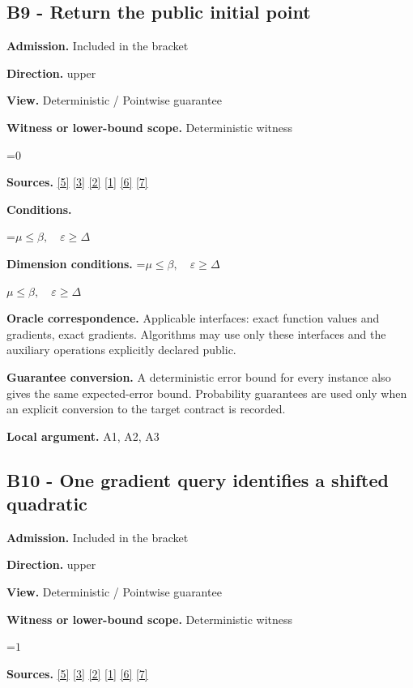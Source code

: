 \documentclass[10pt,a4paper]{article}
\newcommand{\AtlasMath}[1]{\par\begingroup\centering\setbox0=\hbox{$\displaystyle #1$}\ifdim\wd0>1.4\linewidth\typeout{ATLAS WIDE FORMULA: \the\wd0}\fi\ifdim\wd0>\linewidth\resizebox{\linewidth}{!}{\box0}\else\box0\fi\par\endgroup}
\newcommand{\AtlasInlineMath}[1]{\begingroup\setbox0=\hbox{$#1$}\ifdim\wd0>.4\linewidth\endgroup\AtlasMath{#1}\else\endgroup$#1$\fi}
\begin{document}
\subsection{B9 - Return the public initial point}
\textbf{Admission.} Included in the bracket

\textbf{Direction.} upper

\textbf{View.} Deterministic / Pointwise guarantee

\textbf{Witness or lower-bound scope.} Deterministic witness

\AtlasMath{0}
\textbf{Sources.} \href{https://arxiv.org/pdf/2101.09740v2}{[5]} \href{https://arxiv.org/pdf/2609.33360v2}{[3]} \href{https://arxiv.org/pdf/2609.10874}{[2]} \href{https://arxiv.org/pdf/1405.4980}{[1]} \href{https://www2.isye.gatech.edu/~nemirovs/MOR_AccuracyCertificates.pdf}{[6]} \href{https://arxiv.org/pdf/2609.20701}{[7]}

\textbf{Conditions.} 
\AtlasMath{\mu\le\beta,\quad\varepsilon\ge\Delta}


\textbf{Dimension conditions.} \AtlasInlineMath{\mu\le\beta,\quad\varepsilon\ge\Delta}

\textbf{Oracle correspondence.} Applicable interfaces: exact function values and gradients, exact gradients. Algorithms may use only these interfaces and the auxiliary operations explicitly declared public.

\textbf{Guarantee conversion.} A deterministic error bound for every instance also gives the same expected-error bound. Probability guarantees are used only when an explicit conversion to the target contract is recorded.

\textbf{Local argument.} A1, A2, A3

\subsection{B10 - One gradient query identifies a shifted quadratic}
\textbf{Admission.} Included in the bracket

\textbf{Direction.} upper

\textbf{View.} Deterministic / Pointwise guarantee

\textbf{Witness or lower-bound scope.} Deterministic witness

\AtlasMath{1}
\textbf{Sources.} \href{https://arxiv.org/pdf/2101.09740v2}{[5]} \href{https://arxiv.org/pdf/2609.33360v2}{[3]} \href{https://arxiv.org/pdf/2609.10874}{[2]} \href{https://arxiv.org/pdf/1405.4980}{[1]} \href{https://www2.isye.gatech.edu/~nemirovs/MOR_AccuracyCertificates.pdf}{[6]} \href{https://arxiv.org/pdf/2609.20701}{[7]}
\end{document}
